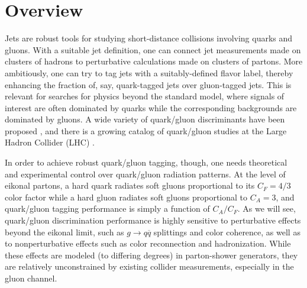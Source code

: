 \documentclass[11pt,letterpaper]{article}
\begin{document}

\maketitle

\section{Overview}
\label{sec:overview}

Jets are robust tools for studying short-distance collisions involving quarks and gluons.  With a suitable jet definition, one can connect jet measurements made on clusters of hadrons to perturbative calculations made on clusters of partons.  More ambitiously, one can try to tag jets with a suitably-defined flavor label, thereby enhancing the fraction of, say, quark-tagged jets over gluon-tagged jets.  This is relevant for searches for physics beyond the standard model, where signals of interest are often dominated by quarks while the corresponding backgrounds are dominated by gluons.  A wide variety of quark/gluon discriminants have been proposed \cite{Nilles:1980ys,Jones:1988ay,Fodor:1989ir,Jones:1990rz,Lonnblad:1990qp,Pumplin:1991kc,Gallicchio:2011xq,Gallicchio:2012ez,Krohn:2012fg,Pandolfi:1480598,Chatrchyan:2012sn,Larkoski:2013eya,Larkoski:2014pca,Bhattacherjee:2015psa,FerreiradeLima:2016gcz,Bhattacherjee:2016bpy,Komiske:2016rsd,Davighi:2017hok}, and there is a growing catalog of quark/gluon studies at the Large Hadron Collider (LHC) \cite{Aad:2014gea,Aad:2014bia,Khachatryan:2014dea,Aad:2015owa,Khachatryan:2015bnx,Aad:2016oit}.

In order to achieve robust quark/gluon tagging, though, one needs theoretical and experimental control over quark/gluon radiation patterns.  At the level of eikonal partons, a hard quark radiates soft gluons proportional to its $C_F = 4/3$ color factor while a hard gluon radiates soft gluons proportional to $C_A = 3$, and quark/gluon tagging performance is simply a function of $C_A/C_F$.  As we will see, quark/gluon discrimination performance is highly sensitive to  perturbative effects beyond the eikonal limit, such as $g \to q \overline{q}$ splittings and color coherence, as well as to nonperturbative effects such as color reconnection and hadronization.   While these effects are modeled (to differing degrees) in parton-shower generators, they are relatively unconstrained by existing collider measurements, especially in the gluon channel.
\end{document}
